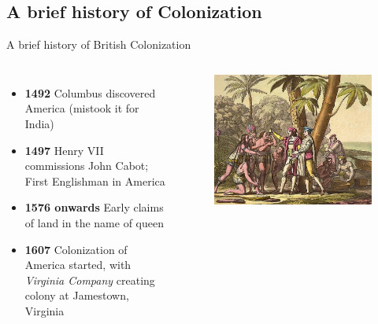 \documentclass{beamer}
\begin{document}
\subsection{A brief history of Colonization}
\begin{frame}{A brief history of British Colonization}
  \begin{columns}[c]
  \begin{itemize}
  \item \textbf{1492} Columbus discovered America (mistook it for India)
  \item \textbf{1497} Henry VII commissions John Cabot; First Englishman in America
  \item \textbf{1576 onwards} Early claims of land in the name of queen
  \item \textbf{1607} Colonization of America started, with \emph{Virginia Company} creating colony at Jamestown, Virginia
  \end{itemize}
    \begin{figure}[htp]
      \begin{center}
        \centering
        \includegraphics[scale=0.29]{../Presentation/columbus.jpg}
      \end{center}
    \end{figure}
    \end{columns}
\end{frame}
\end{document}
